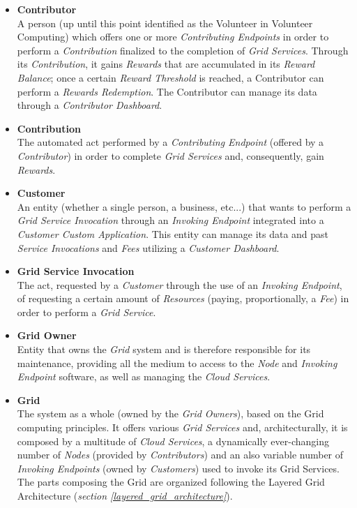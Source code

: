 \begin{itemize}
    \item \textbf{Contributor}\label{contributor}\\
    A person (up until this point identified as the Volunteer in Volunteer Computing) which offers one or more \textit{Contributing Endpoints} in order to perform a \textit{Contribution} finalized to the completion of \textit{Grid Services}. Through its \textit{Contribution}, it gains \textit{Rewards} that are accumulated in its \textit{Reward Balance}; once a certain \textit{Reward Threshold} is reached, a Contributor can perform a \textit{Rewards Redemption}. The Contributor can manage its data through a \textit{Contributor Dashboard}.
    \item \textbf{Contribution}\label{contribution}\\
    The automated act performed by a \textit{Contributing Endpoint} (offered by a \textit{Contributor}) in order to complete \textit{Grid Services} and, consequently, gain \textit{Rewards}.
    \item \textbf{Customer}\label{customer}\\
    An entity (whether a single person, a business, etc...) that wants to perform a \textit{Grid Service Invocation} through an \textit{Invoking Endpoint} integrated into a \textit{Customer Custom Application}. This entity can manage its data and past \textit{Service Invocations} and \textit{Fees} utilizing a \textit{Customer Dashboard}.
    \item \textbf{Grid Service Invocation}\label{grid_service_invocation}\\
    The act, requested by a \textit{Customer} through the use of an \textit{Invoking Endpoint}, of requesting a certain amount of \textit{Resources} (paying, proportionally, a \textit{Fee}) in order to perform a \textit{Grid Service}.
    \item \textbf{Grid Owner}\label{grid_owner}\\
    Entity that owns the \textit{Grid} system and is therefore responsible for its maintenance, providing all the medium to access to the \textit{Node} and \textit{Invoking Endpoint} software, as well as managing the \textit{Cloud Services}.
    \item \textbf{Grid}\label{grid}\\
    The system as a whole (owned by the \textit{Grid Owners}), based on the Grid computing principles. It offers various \textit{Grid Services} and, architecturally, it is composed by a multitude of \textit{Cloud Services}, a dynamically ever-changing number of \textit{Nodes} (provided by \textit{Contributors}) and an also variable number of \textit{Invoking Endpoints} (owned by \textit{Customers}) used to invoke its Grid Services. The parts composing the Grid are organized following the Layered Grid Architecture (\textit{section \ref{layered_grid_architecture}}).

\end{itemize}
